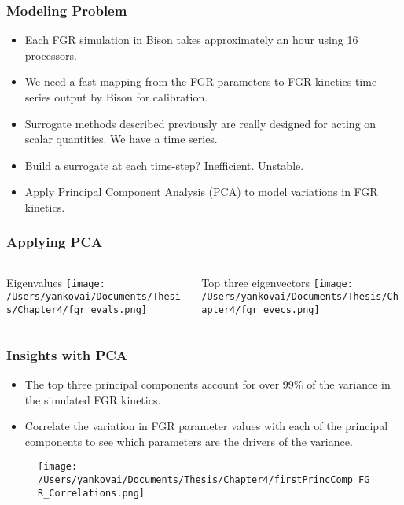 \begin{frame}
\frametitle{Modeling Problem}

\begin{itemize}
  \item Each FGR simulation in Bison takes approximately an hour using 16 processors.
  \item We need a fast mapping from the FGR parameters to FGR kinetics time series output by Bison for calibration.
  \item Surrogate methods described previously are really designed for acting on scalar quantities. We have a time series.
  \item Build a surrogate at each time-step? Inefficient. Unstable.  
  \item Apply Principal Component Analysis (PCA) to model variations in FGR kinetics. 
\end{itemize}

\end{frame}
\begin{frame}
\frametitle{Applying PCA}

\begin{columns}
 \begin{column}{0.5\textwidth}
  \centering
  Eigenvalues
  \texttt{[image: /Users/yankovai/Documents/Thesis/Chapter4/fgr\_evals.png]}
 \end{column}
 \begin{column}{0.5\textwidth}
  \centering
  Top three eigenvectors
  \texttt{[image: /Users/yankovai/Documents/Thesis/Chapter4/fgr\_evecs.png]}
 \end{column}
\end{columns}

\end{frame}
\begin{frame}
\frametitle{Insights with PCA}

\begin{itemize}
  \item The top three principal components account for over 99\% of the variance in the simulated FGR kinetics.
  \item Correlate the variation in FGR parameter values with each of the principal components to see which parameters are the drivers of the variance.
\end{itemize}

\begin{figure}
  \texttt{[image: /Users/yankovai/Documents/Thesis/Chapter4/firstPrincComp\_FGR\_Correlations.png]}
\end{figure}

\end{frame}
